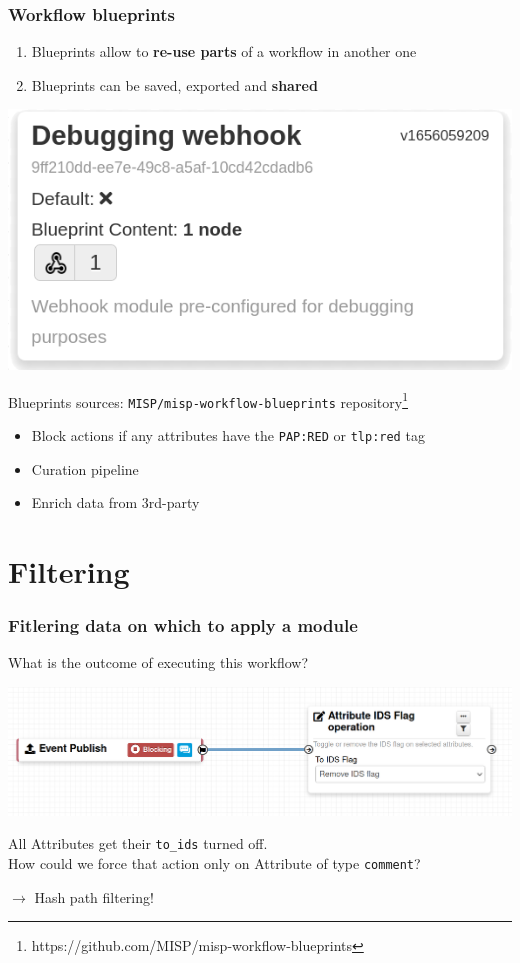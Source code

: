 \begin{frame}
    \frametitle{Workflow blueprints}
    \begin{enumerate}
        \item Blueprints allow to \textbf{re-use parts} of a workflow in another one
        \item Blueprints can be saved, exported and \textbf{shared}
    \end{enumerate}
    \begin{center}
        \includegraphics[width=0.5\linewidth]{pictures/blueprint-debugging.png}
    \end{center}
    Blueprints sources: \texttt{\scriptsize MISP/misp-workflow-blueprints} repository\footnote{\scriptsize https://github.com/MISP/misp-workflow-blueprints}
    \begin{itemize}
        \small
        \item Block actions if any attributes have the \texttt{PAP:RED} or \texttt{tlp:red} tag
        \item Curation pipeline
        \item Enrich data from 3rd-party
    \end{itemize}
\end{frame}

\section{Filtering}
\begin{frame}
    \frametitle{Fitlering data on which to apply a module}
    What is the outcome of executing this workflow?
    \begin{center}
        \includegraphics[width=1.0\textwidth]{pictures/remove-ids-1.png}
    \end{center}
    \pause
    \vspace{1em}
    All Attributes get their \texttt{to\_ids} turned off.\\
    \vspace{1em}
    How could we force that action only on Attribute of type \texttt{comment}?
    \begin{center}
        $\rightarrow$ Hash path filtering!
    \end{center}
\end{frame}

